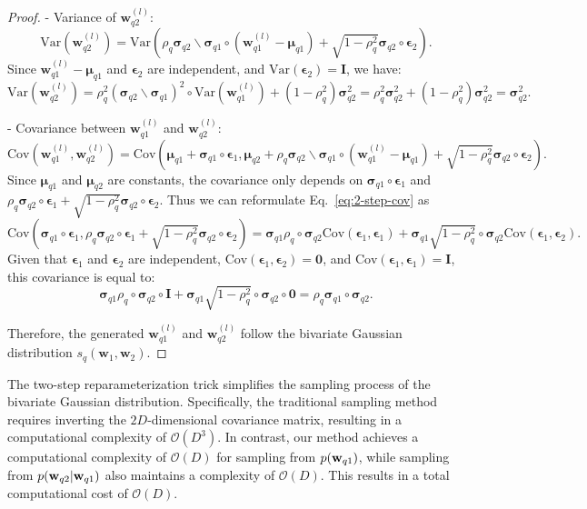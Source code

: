 \begin{proof}
   - Variance of $\mathbf{w}_{q2}^{(l)}$:
     \[
     \text{Var}(\mathbf{w}_{q2}^{(l)}) = \text{Var}\left(\rho_q \bm{\sigma}_{q2} \backslash \bm{\sigma}_{q1} \circ  (\mathbf{w}_{q1}^{(l)} - \bm{\mu}_{q1}) + \sqrt{1 - \rho_q^2}  \bm{\sigma}_{q2} \circ \bm{\epsilon}_2\right).
     \]
     Since $\mathbf{w}_{q1}^{(l)} - \bm{\mu}_{q1}$ and $\bm{\epsilon}_2$ are independent, and $\text{Var}(\bm{\epsilon}_2) = \mathbf{I} $, we have:
     \[
     \text{Var}(\mathbf{w}_{q2}^{(l)}) = \rho_q^2 \left(\bm{\sigma}_{q2} \backslash \bm{\sigma}_{q1}\right)^2 \circ \text{Var}(\mathbf{w}_{q1}^{(l)}) + (1 - \rho_q^2) \bm{\sigma}_{q2}^2 = \rho_q^2 \bm{\sigma}_{q2}^2 + (1 - \rho_q^2) \bm{\sigma}_{q2}^2 = \bm{\sigma}_{q2}^2.
     \]

   - Covariance between $\mathbf{w}_{q1}^{(l)}$ and $\mathbf{w}_{q2}^{(l)}$:
   \begin{equation}
       \text{Cov}(\mathbf{w}_{q1}^{(l)}, \mathbf{w}_{q2}^{(l)}) = \text{Cov}\left(\bm{\mu}_{q1} + \bm{\sigma}_{q1} \circ \bm{\epsilon}_1, \bm{\mu}_{q2} + \rho_q \bm{\sigma}_{q2} \backslash \bm{\sigma}_{q1} \circ  (\mathbf{w}_{q1}^{(l)} - \bm{\mu}_{q1}) + \sqrt{1 - \rho_q^2}  \bm{\sigma}_{q2} \circ \bm{\epsilon}_2\right). 
       \label{eq:2-step-cov}
   \end{equation}
     Since $\bm{\mu}_{q1}$ and $\bm{\mu}_{q2}$ are constants, the covariance only depends on $\bm{\sigma}_{q1} \circ \bm{\epsilon}_1$ and $\rho_q \bm{\sigma}_{q2} \circ \bm{\epsilon}_1 + \sqrt{1 - \rho_q^2}  \bm{\sigma}_{q2} \circ \bm{\epsilon}_2$. Thus we can reformulate Eq.~\eqref{eq:2-step-cov} as  
     \[
     \text{Cov}(\bm{\sigma}_{q1} \circ \bm{\epsilon}_1, \rho_q \bm{\sigma}_{q2} \circ \bm{\epsilon}_1 + \sqrt{1 - \rho_q^2} \bm{\sigma}_{q2} \circ \bm{\epsilon}_2)  = \bm{\sigma}_{q1} \rho_q \circ \bm{\sigma}_{q2} \text{Cov}(\bm{\epsilon}_1, \bm{\epsilon}_1) + \bm{\sigma}_{q1} \sqrt{1 - \rho_q^2} \circ \bm{\sigma}_{q2} \text{Cov}(\bm{\epsilon}_1, \bm{\epsilon}_2).
     \]
    Given that $\bm{\epsilon}_1$ and $\bm{\epsilon}_2$ are independent, $\text{Cov}(\bm{\epsilon}_1, \bm{\epsilon}_2) = \bm{0}$, and $\text{Cov}(\bm{\epsilon}_1, \bm{\epsilon}_1) = \mathbf{I}$, this covariance is equal to:
     \[
     \bm{\sigma}_{q1} \rho_q \circ\bm{\sigma}_{q2} \circ \mathbf{I} + \bm{\sigma}_{q1} \sqrt{1 - \rho_q^2} \circ \bm{\sigma}_{q2} \circ \bm{0} = \rho_q \bm{\sigma}_{q1} \circ \bm{\sigma}_{q2}.
     \]

Therefore, the generated $\mathbf{w}_{q1}^{(l)}$ and  $\mathbf{w}_{q2}^{(l)}$ follow the bivariate Gaussian distribution $s_q(\mathbf{w}_1, \mathbf{w}_2)$. 
\end{proof}
The two-step reparameterization trick simplifies the sampling process of the bivariate Gaussian distribution. Specifically, the traditional sampling method \citep{mohamed2020monte} requires inverting the \(2D\)-dimensional covariance matrix, resulting in a computational complexity of \( \mathcal{O}(D^3) \). In contrast, our method achieves a computational complexity of \( \mathcal{O}(D)\) for sampling from \(p({\mathbf w}_{q1})\), while sampling from \(p({\mathbf w}_{q2} \vert {\mathbf w}_{q1})\) also maintains a complexity of \( \mathcal{O}(D)\). This results in a total computational cost of \( \mathcal{O}(D) \). 

